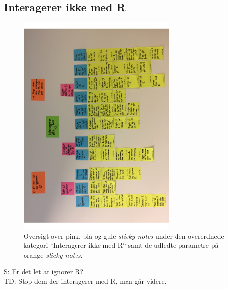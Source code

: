 \subsection{Interagerer ikke med R}
%
\begin{figure}[H]
\centering
\includegraphics[width = 0.7\textwidth, angle = -90]{Figure/AffinityDiagram/InteragererIkkeMedR} 
\caption{Oversigt over pink, blå og gule \textit{sticky notes} under den overordnede kategori ``Interagerer ikke med R`` samt de udledte parametre på orange \textit{sticky notes}.}
\label{fig:AFInteragererIkkeMedR}
\end{figure}
\noindent
%
S: Er det let at ignorer R?\\
TD: Stop dem der interagerer med R, men går videre. 
